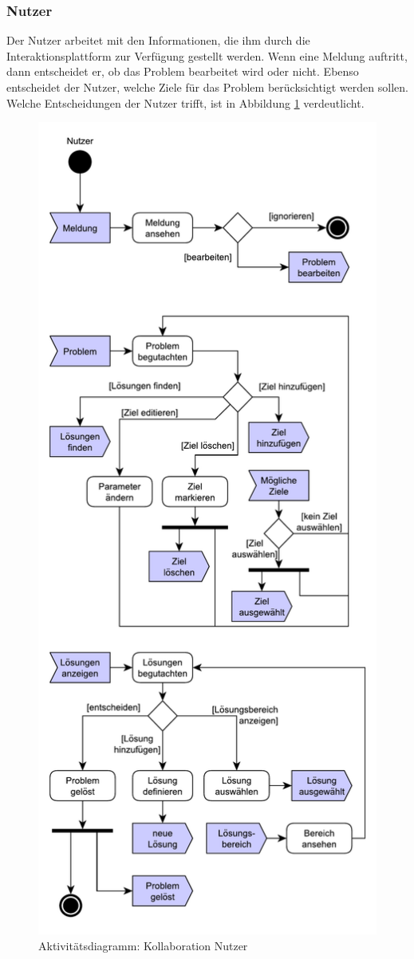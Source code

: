 \subsubsection*{Nutzer}
Der Nutzer arbeitet mit den Informationen, die ihm durch die Interaktionsplattform zur Verfügung gestellt werden. Wenn eine Meldung auftritt, dann entscheidet er, ob das Problem bearbeitet wird oder nicht. Ebenso entscheidet der Nutzer, welche Ziele für das Problem berücksichtigt werden sollen. Welche Entscheidungen der Nutzer trifft, ist in Abbildung \ref{pic:Kollaboration-Nutzer} verdeutlicht.
\begin{figure}[htbp]
\centering
\includegraphics[scale=0.5]{Da_files/UML/Konzept/Aktivitaetsdiagramm-Nutzer.pdf}
\caption{Aktivitätsdiagramm: Kollaboration Nutzer}
\label{pic:Kollaboration-Nutzer}
\end{figure}

